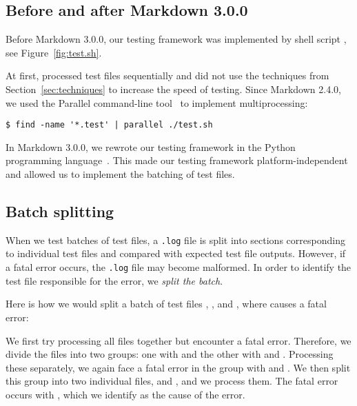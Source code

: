 \documentclass[final]{ltugboat}
\begin{document}
\subsection{Before and after Markdown 3.0.0}

Before Markdown 3.0.0, our testing framework was implemented by shell script , see Figure~\ref{fig:test.sh}.

At first,  processed test files sequentially and did not use the techniques from Section~\ref{sec:techniques} to increase the speed of testing. Since Markdown 2.4.0, we used the  Parallel command-line tool~\cite{tange2011gnu} to implement multiprocessing:

\begin{verbatim}
$ find -name '*.test' | parallel ./test.sh
\end{verbatim}

In Markdown 3.0.0, we rewrote our testing framework in the Python programming language~\cite{starynovotny2023implement}. This made our testing framework platform-independent and allowed us to implement the batching of test files.

\subsection{Batch splitting}

When we test batches of test files, a \texttt{.log} file is split into sections corresponding to individual test files and compared with expected test file outputs. However, if a fatal error occurs, the \texttt{.log} file may become malformed. In order to identify the test file responsible for the error, we \emph{split the batch}.

Here is how we would split a batch of test files , , and , where  causes a fatal error:

\medskip
\noindent
\begingroup
\centering

\par
\endgroup

\medskip
\noindent
We first try processing all files together but encounter a fatal error. Therefore, we divide the files into two groups: one with  and the other with  and . Processing these separately, we again face a fatal error in the group with  and . We then split this group into two individual files,  and , and we process them. The fatal error occurs with , which we identify as the cause of the error.
\end{document}
